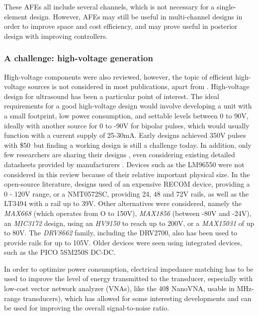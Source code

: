 \documentclass{article}
\begin{document}
These AFEs all include several channels, which is not necessary for a single-element design. However, AFEs may still be useful in multi-channel designs in order to improve space and cost efficiency, and may prove useful in posterior design with improving controllers.

\subsubsection{A challenge: high-voltage generation}

High-voltage components were also reviewed, however, the topic of efficient high-voltage sources is not considered in most publications, apart from \cite{xiao_design_2013}. High-voltage design for ultrasound has been a particular point of interest. The ideal requirements for a good high-voltage design would involve developing a unit with a small footprint, low power consumption, and settable levels between 0 to 90V, ideally with another source for 0 to -90V for bipolar pulses, which would usually function with a current supply of 25-30mA.  Early designs \cite{brown_low-cost_2002} achieved 350V pulses with \$50\, but finding a working design is still a challenge today. In addition, only few researchers are sharing their designs \cite{tang_computerized_2014}, even considering existing detailed datasheets provided by manufacturers \cite{granata_designing_2020}. Devices such as the LM96550 were not considered in this review because of their relative important physical size. In the open-source literature, designs  used of an expensive RECOM device, providing a 0 - 120V range, or a NMT0572SC, providing 24, 48 and 72V rails, as well as the LT3494 with a rail up to 39V. Other alternatives were considered, namely the \emph{MAX668} (which operates from O to 150V), \emph{MAX1856} (between -80V and -24V), an \emph{MIC3172} design, using an \emph{HV9150} to reach up to 200V, or a \emph{MAX15031} of up to 80V. The \emph{DRV8662} family, including the DRV2700, also has been used to provide rails for up to 105V. Older devices were seen using integrated devices, such as the PICO 5SM250S DC-DC. 

In order to optimize power consumption, electrical impedance matching \cite{rathod_review_2019} has to be used to improve the level of energy transmitted to the transducer, especially with low-cost vector network analyzer (VNAs), like the 40\$ NanoVNA, usable in MHz-range transducers), which has allowed for some interesting developments \cite{garcia-rodriguez_low_2010, wei_design_2020} and can be used for improving the overall signal-to-noise ratio.
\end{document}
